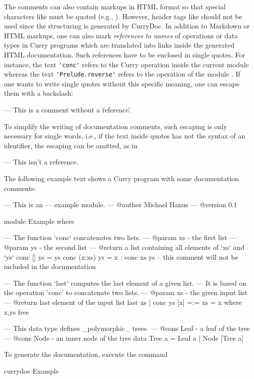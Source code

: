 The comments can also contain markups in HTML format
so that special characters like \ccode{<}
must be quoted (e.g., ).
However, header tags like  should not be used
since the structuring is generated by CurryDoc.
In addition to Markdown or HTML markups,
one can also mark \emph{references to names} of operations or data types
in Curry programs which are translated into links inside
the generated HTML documentation. Such references have to be
enclosed in single quotes. For instance, the text
\verb!'conc'! refers to the Curry operation 
inside the current module whereas the text
\verb!'Prelude.reverse'! refers to the operation 
of the module .
If one wants to write single quotes without this specific
meaning, one can escape them with a backslash:
\begin{curry}
--- This is a comment without a \'reference\'.
\end{curry}
To simplify the writing of documentation comments,
such escaping is only necessary for single words,
i.e., if the text inside quotes has not the syntax of
an identifier, the escaping can be omitted, as in
\begin{curry}
--- This isn't a reference.
\end{curry}
%
The following example text shows a Curry program with some
documentation comments:
\begin{curry}
--- This is an
--- example module.
--- @author Michael Hanus
--- @version 0.1

module Example where

--- The function `conc` concatenates two lists.
--- @param xs - the first list
--- @param ys - the second list
--- @return a list containing all elements of `xs` and `ys`
conc []     ys = ys
conc (x:xs) ys = x : conc xs ys
-- this comment will not be included in the documentation

--- The function `last` computes the last element of a given list.
--- It is based on the operation 'conc' to concatenate two lists.
--- @param xs - the given input list
--- @return last element of the input list
last xs | conc ys [x] =:= xs  = x   where x,ys free

--- This data type defines _polymorphic_ trees.
--- @cons Leaf - a leaf of the tree
--- @cons Node - an inner node of the tree
data Tree a = Leaf a | Node [Tree a]
\end{curry}
\noindent
To generate the documentation, execute the command
\begin{curry}
currydoc Example
\end{curry}
